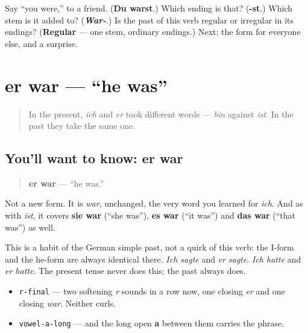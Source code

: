 \begin{tcolorbox}[breakable,colback=teal!4,colframe=teal!35!black,title={Before you move on}]
Say \textquotedblleft{}you were,\textquotedblright{} to a friend. (\textbf{Du warst}.) Which ending is that? (\textbf{-st}.) Which stem is it added to? (\emph{\textbf{War-}}.) Is the past of this verb regular or irregular in its endings? (\textbf{Regular} — one stem, ordinary endings.) Next: the form for everyone else, and a surprise.
\end{tcolorbox}
\section[er war]{er war — \textquotedblleft{}he was\textquotedblright{}}

\label{lesson:GE-C16-er-war}



\begin{quote}
In the present, \emph{ich} and \emph{er} took different words — \emph{bin} against \emph{ist}. In the past they take the same one.
\end{quote}

\subsection*{You'll want to know: er war}
\begin{quote}
\textbf{er war} — \textquotedblleft{}he was.\textquotedblright{}
\end{quote}

Not a new form. It is \emph{war}, unchanged, the very word you learned for \emph{ich}. And as with \emph{ist}, it covers \textbf{sie war} (\textquotedblleft{}she was\textquotedblright{}), \textbf{es war} (\textquotedblleft{}it was\textquotedblright{}) and \textbf{das war} (\textquotedblleft{}that was\textquotedblright{}) as well.

This is a habit of the German simple past, not a quirk of this verb: the I-form and the he-form are always identical there. \emph{Ich sagte} and \emph{er sagte}. \emph{Ich hatte} and \emph{er hatte}. The present tense never does this; the past always does.

\begin{sounds}
\begin{itemize}
\raggedright
  \item \texttt{r-final} — two softening \emph{r} sounds in a row now, one closing \emph{er} and one closing \emph{war}. Neither curls.
  \item \texttt{vowel-a-long} — and the long open \textbf{a} between them carries the phrase.
\end{itemize}
\end{sounds}

